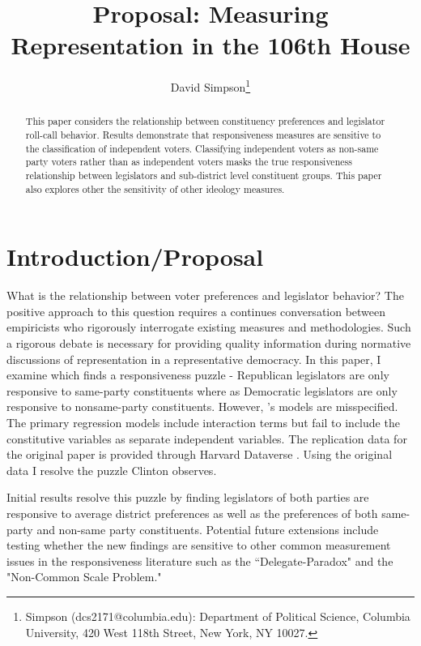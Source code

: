 \documentclass[10pt,letterpaper]{article}
\author{David Simpson\footnote{Simpson (dcs2171@columbia.edu): Department of Political Science, Columbia University, 420 West 118th Street, New York, NY 10027.}}
\title{Proposal: Measuring Representation in the 106th House}
\begin{document}
\maketitle

\begin{abstract}
This paper considers the relationship between constituency preferences and legislator roll-call behavior. Results demonstrate that responsiveness measures are sensitive to the classification of independent voters. Classifying independent voters as non-same party voters rather than as independent voters masks the true responsiveness relationship between legislators and sub-district level constituent groups. This paper also explores other the sensitivity of other ideology measures.
\end{abstract}

\section{Introduction/Proposal}
What is the relationship between voter preferences and legislator behavior? The positive approach to this question requires a continues conversation between empiricists who rigorously interrogate existing measures and methodologies. Such a rigorous debate is necessary for providing quality information during normative discussions of representation in a representative democracy. In this paper, I examine \cite{Clinton2006} which finds a responsiveness puzzle - Republican legislators are only responsive to same-party constituents where as Democratic legislators are only responsive to nonsame-party constituents. However, \cite{Clinton2006}'s models are misspecified. The primary regression models include interaction terms but fail to include the constitutive variables as separate independent variables. The replication data for the original paper is provided through Harvard Dataverse \cite{Clinton2009}. Using the original data I resolve the puzzle Clinton observes.  


Initial results resolve this puzzle by finding legislators of both parties are responsive to average district preferences as well as the preferences of both same-party and non-same party constituents. Potential future extensions include  testing whether the new findings are sensitive to other common measurement issues in the responsiveness literature such as the ``Delegate-Paradox" and the "Non-Common Scale Problem."
\end{document}
